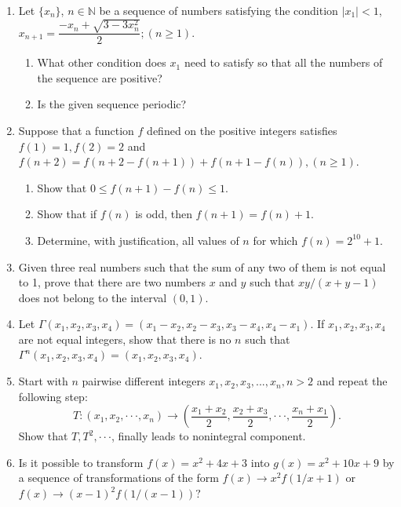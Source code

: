 \documentclass[12pt]{article}
\begin{document}
\begin{enumerate}
    \item Let $\{x_{n}\}$, $n\in\mathbb{N}$ be a sequence of numbers satisfying the condition 
    $|x_{1}|<1$, $x_{n+1}=\dfrac{-x_{n}+\sqrt{3-3x_{n}^{2}}}{2}; (n\ge1)$.
    \begin{enumerate}
        \item[(a)] What other condition does $x_{1}$ need to satisfy so that all the numbers of the sequence are positive?
        \item[(b)] Is the given sequence periodic?
    \end{enumerate}
    
    \item Suppose that a function $f$ defined on the positive integers satisfies $f(1)=1, f(2)=2$ and $f(n+2)=f(n+2-f(n+1))+f(n+1-f(n)), (n\ge1)$.
    \begin{enumerate}
        \item[(a)] Show that $0\le f(n+1)-f(n)\le1$.
        \item[(b)] Show that if $f(n)$ is odd, then $f(n+1)=f(n)+1$.
        \item[(c)] Determine, with justification, all values of $n$ for which $f(n)=2^{10}+1.$
    \end{enumerate}

    \item Given three real numbers such that the sum of any two of them is not equal to 1, prove that there are two numbers $x$ and $y$ such that $xy/(x+y-1)$ does not belong to the interval $(0, 1)$.

    \item Let $\Gamma(x_{1},x_{2},x_{3},x_{4})=(x_{1}-x_{2},x_{2}-x_{3},x_{3}-x_{4},x_{4}-x_{1})$. If $x_{1}, x_{2}, x_{3}, x_{4}$ are not equal integers, show that there is no $n$ such that $\Gamma^{n}(x_{1},x_{2},x_{3},x_{4})=(x_{1},x_{2},x_{3},x_{4})$.

    \item Start with $n$ pairwise different integers $x_{1},x_{2},x_{3},...,x_{n},n>2$ and repeat the following step: 
    $$T:(x_{1},x_{2},\cdot\cdot\cdot,x_{n})\rightarrow\left(\dfrac{x_{1}+x_{2}}{2},\dfrac{x_{2}+x_{3}}{2},\cdot\cdot\cdot,\dfrac{x_{n}+x_{1}}{2}\right).$$ 
    Show that $T,T^{2},\cdot\cdot\cdot$, finally leads to nonintegral component.

    \item Is it possible to transform $f(x)=x^{2}+4x+3$ into $g(x)=x^{2}+10x+9$ by a sequence of transformations of the form $f(x)\rightarrow x^{2}f(1/x+1)$ or $f(x)\rightarrow(x-1)^{2}f(1/(x-1))?$


\end{enumerate}
\end{document}
